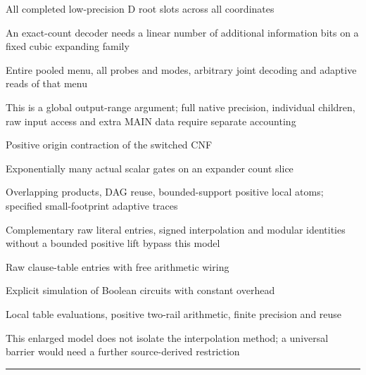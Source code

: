 \documentclass[11pt,a4paper]{article}
\newlength{\OfflineResearchTableWidth}
\newcommand{\OfflineResearchHeaderRule}{\noindent\rule{\linewidth}{0.45pt}\par}
\newcommand{\OfflineResearchRow}{\par}
\newenvironment{OfflineResearchTable}{%
  \par\medskip\begingroup\small\setlength{\parindent}{0pt}%
  \setlength{\parskip}{3pt plus 1pt minus .5pt}%
  \setlength{\OfflineResearchTableWidth}{\linewidth}%
}{%
  \par\endgroup\medskip%
}
\begin{document}
\begin{OfflineResearchTable}
\begin{minipage}[t]{0.17955\OfflineResearchTableWidth}
All completed low-precision D root slots across all coordinates
\end{minipage}\hfill%
\begin{minipage}[t]{0.22680\OfflineResearchTableWidth}\raggedright
An
exact-count decoder needs a linear number of additional information bits
on a fixed cubic expanding family
\end{minipage}\hfill%
\begin{minipage}[t]{0.23625\OfflineResearchTableWidth}\raggedright
Entire pooled menu, all probes and
modes, arbitrary joint decoding and adaptive reads of that menu
\end{minipage}\hfill%
\begin{minipage}[t]{0.30240\OfflineResearchTableWidth}\raggedright
This
is a global output-range argument; full native precision, individual
children, raw input access and extra MAIN data require separate
accounting
\end{minipage}%
\OfflineResearchRow
\noindent%
\begin{minipage}[t]{0.17955\OfflineResearchTableWidth}\raggedright
Positive origin contraction of the switched CNF
\end{minipage}\hfill%
\begin{minipage}[t]{0.22680\OfflineResearchTableWidth}\raggedright
Exponentially many
actual scalar gates on an expander count slice
\end{minipage}\hfill%
\begin{minipage}[t]{0.23625\OfflineResearchTableWidth}\raggedright
Overlapping products,
DAG reuse, bounded-support positive local atoms; specified
small-footprint adaptive traces
\end{minipage}\hfill%
\begin{minipage}[t]{0.30240\OfflineResearchTableWidth}\raggedright
Complementary raw literal entries,
signed interpolation and modular identities without a bounded positive
lift bypass this model
\end{minipage}%
\OfflineResearchRow
\noindent%
\begin{minipage}[t]{0.17955\OfflineResearchTableWidth}\raggedright
Raw clause-table entries with free arithmetic wiring
\end{minipage}\hfill%
\begin{minipage}[t]{0.22680\OfflineResearchTableWidth}\raggedright
Explicit
simulation of Boolean circuits with constant overhead
\end{minipage}\hfill%
\begin{minipage}[t]{0.23625\OfflineResearchTableWidth}\raggedright
Local table
evaluations, positive two-rail arithmetic, finite precision and reuse
\end{minipage}\hfill%
\begin{minipage}[t]{0.30240\OfflineResearchTableWidth}\raggedright
This enlarged model does not isolate the interpolation method; a
universal barrier would need a further source-derived restriction
\end{minipage}%
\OfflineResearchRow
\OfflineResearchHeaderRule
\end{OfflineResearchTable}
\end{document}
